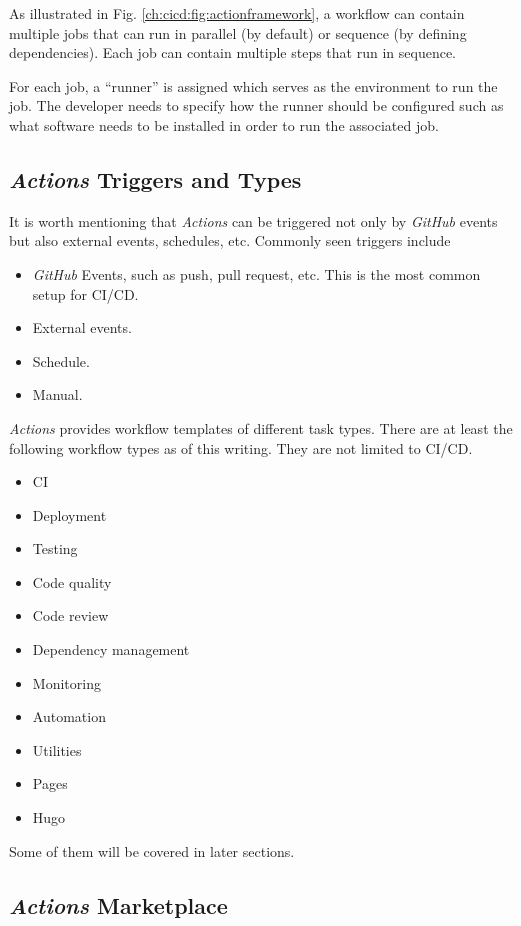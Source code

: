 As illustrated in Fig. \ref{ch:cicd:fig:actionframework}, a workflow can contain multiple jobs that can run in parallel (by default) or sequence (by defining dependencies). Each job can contain multiple steps that run in sequence.

For each job, a ``runner'' is assigned which serves as the environment to run the job. The developer needs to specify how the runner should be configured such as what software needs to be installed in order to run the associated job.

\subsection{\textit{Actions} Triggers and Types}

It is worth mentioning that \textit{Actions} can be triggered not only by \textit{GitHub} events but also external events, schedules, etc. Commonly seen triggers include
\begin{itemize}
	\item \textit{GitHub} Events, such as push, pull request, etc. This is the most common setup for CI/CD.
	\item External events.
	\item Schedule.
	\item Manual.
\end{itemize}

\textit{Actions} provides workflow templates of different task types. There are at least the following workflow types as of this writing. They are not limited to CI/CD.
\begin{itemize}
	\item CI
	\item Deployment
	\item Testing
	\item Code quality
	\item Code review
	\item Dependency management
	\item Monitoring
	\item Automation
	\item Utilities
	\item Pages
	\item Hugo
\end{itemize}
Some of them will be covered in later sections.

\subsection{\textit{Actions} Marketplace}

